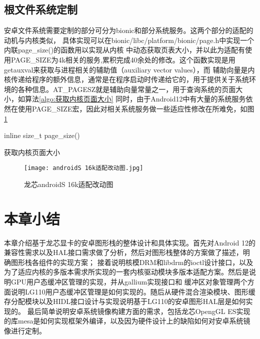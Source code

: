 \subsection{根文件系统定制}
安卓文件系统需要定制的部分可分为bionic和部分系统服务。这两个部分的适配的动机与内核类似，
具体实现可以在bionic/libc/platform/bionic/page.h中实现一个内联page\_size()的函数用以实现从内核
中动态获取页表大小，并以此为适配有使用PAGE\_SIZE为4k相关的服务,累积完成40余处的修改。这个函数实现是用getauxval来获取与进程相关的辅助值（auxiliary vector values），而
辅助向量是内核传递给程序的额外信息，通常是在程序启动时传递给它的，用于提供关于系统环境的各种信息。AT\_PAGESZ就是辅助向量常量之一，用于查询系统的页面大小，如算法\ref{algo:获取内核页面大小}
同时，由于Android12中有大量的系统服务依然在使用PAGE\_SIZE宏，因此对相关系统服务做一些适应性修改在所难免，如图\ref{fig:androidS 16k适配改动图}
\begin{algorithm}
  \SetAlgoLined
  inline size\_t page\_size(){\\
  }
  \caption{获取内核页面大小}
  \label{algo:获取内核页面大小}
\end{algorithm}

\begin{figure}
  \centering
  \texttt{[image: androidS 16k适配改动图.jpg]}
  \caption{龙芯androidS 16k适配改动图}
  \label{fig:androidS 16k适配改动图}
\end{figure}


\section{本章小结}
本章介绍基于龙芯显卡的安卓图形栈的整体设计和具体实现。首先对Android 12的兼容性需求以及HAL接口需求做了分析，然后对图形栈整体的方案做了描述，明确图形栈各组件的实现方案；
接着说明核模DRM和libdrm的ioctl设计接口，以及为了适应内核的多版本需求所实现的一套内核驱动模块多版本适配方案。然后是说明GPU用户态缓冲区管理的实现，并从gallium实现接口和
缓冲区对象管理两个方面说明LG110用户态缓冲区管理是如何实现的。随后从硬件混合渲染模块、图形缓存分配模块以及HIDL接口设计与实现说明基于LG110的安卓图形HAL层是如何实现的。
最后简单说明安卓系统镜像构建方面的需求，包括龙芯OpengGL ES实现的库mesa是如何实现框架外编译，以及因为硬件设计上的缺陷如何对安卓系统镜像进行定制。

